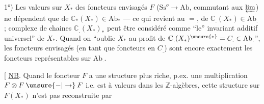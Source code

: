 1°) Les valeurs sur $X_*$ des foncteurs envisagés $F$ ($\mathrm{Ss}^o\longrightarrow \mathrm{Ab}$, commutant aux $\varprojlim$) ne dépendent que de $\mathbb{C}_*(X_*)\in \mathrm{Ab}_*$  --- ce qui revient au $=$, de $\mathbb{C}_{.}(X_*)\in \mathrm{Ab}_{.}$ ;  complexe de chaines $\mathbb{C}_{.}(X_*)_*$ peut être considéré comme ``le'' invariant additif universel'' de $X_*$. Quand on ``oublie $X_*$ au profit de $\mathbb{C}_{.}(X_*)^{\unsure{*}}=C_{.}\in \mathrm{Ab}_{.}$'', les foncteurs envisagés (en tant que foncteurs en $C_{.}$) sont encore exactement les foncteurs représentables sur $\mathrm{Ab}_{.}$.

[ \uline{NB}. Quand le foncteur $F$ a une structure plus riche, p.ex. une multiplication $F\otimes F\mathbin{\unsure{-|\to}}F$ i.e. est à valeurs dans les $\mathbb Z$-algèbres,  cette structure sur $F(X_*)$ n'est pas reconstruite par
